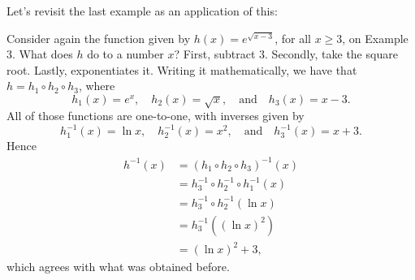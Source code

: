 \documentclass[nooutcomes]{ximera}
\begin{document}
Let's revisit the last example as an application of this:

\begin{example}
  Consider again the function given by $h(x) = e^{\sqrt{x-3}}$, for all $x\geq 3$, on Example 3. What does $h$ do to a number $x$? First, subtract $3$. Secondly, take the square root. Lastly, exponentiates it. Writing it mathematically, we have that $h = h_1\circ h_2\circ h_3$, where $$h_1(x) =e^x,\quad h_2(x) = \sqrt{x},\quad\mbox{and}\quad h_3(x)= x-3.$$All of those functions are one-to-one, with inverses given by $$h_1^{-1}(x) = \ln x,\quad h_2^{-1}(x) = x^2,\quad\mbox{and}\quad h_3^{-1}(x) = x+3.$$Hence \begin{align*}h^{-1}(x) &= (h_1\circ h_2\circ h_3)^{-1}(x) \\ &= h_3^{-1}\circ h_2^{-1} \circ h_1^{-1}(x) \\ &= h_3^{-1}\circ h_2^{-1}(\ln x) \\ &= h_3^{-1}((\ln x)^2) \\ &= (\ln x)^2 + 3, \end{align*}which agrees with what was obtained before.
\end{example}
\end{document}

